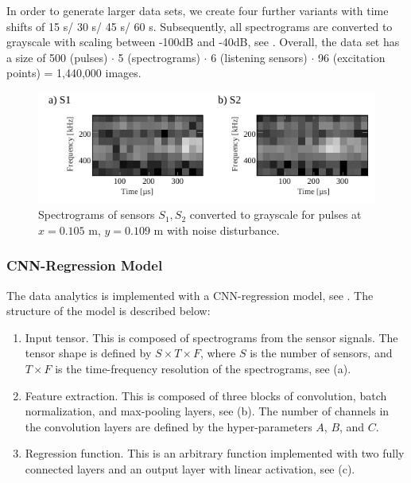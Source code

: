 In order to generate larger data sets, we create four further variants with time shifts of 15 \textmu s/ 30 \textmu s/ 45 \textmu s/ 60 \textmu s. Subsequently, all spectrograms are converted to grayscale with scaling between -100dB and -40dB, see . Overall, the data set has a size of 500 (pulses) $\cdot$ 5 (spectrograms) $\cdot$ 6 (listening sensors) $\cdot$ 96 (excitation points) = 1,440,000 images.

\begin{figure}[b!]
	\centering
	\includegraphics[width=0.5\columnwidth]{./chapters/cnn_accelerator/figures/histograms/spectrograms.pdf}
	\caption{Spectrograms of sensors $S_1, S_2$ converted to grayscale for pulses at $x =0.105$ m, $y = 0.109$ m with noise disturbance.}
	\label{fig:spectrograms}
\end{figure}

\subsubsection{CNN-Regression Model}
The data analytics is implemented with a CNN-regression model, see . The structure of the model is described below:

\begin{enumerate}[label=\alph*)]
\item Input tensor. This is composed of spectrograms from the sensor signals. The tensor shape is defined by $S \times T \times F$, where $S$ is the number of sensors, and $T \times F$ is the time-frequency resolution of the spectrograms, see (a).

\item Feature extraction. This is composed of three blocks of convolution, batch normalization, and max-pooling layers, see (b). The number of channels in the convolution layers are defined by the hyper-parameters $A$, $B$, and $C$.

\item Regression function. This is an arbitrary function implemented with two fully connected layers and an output layer with linear activation, see (c).
\end{enumerate}


